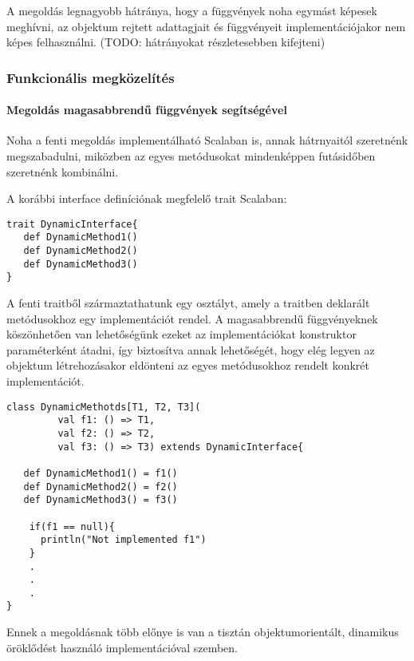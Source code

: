 A megoldás legnagyobb hátránya, hogy a függvények noha egymást képesek meghívni, az objektum rejtett adattagjait
és függvényeit implementációjakor nem képes felhasználni. (TODO: hátrányokat részletesebben kifejteni)


\subsubsection{Funkcionális megközelítés}

\paragraph{Megoldás magasabbrendű függvények segítségével}
Noha a fenti megoldás implementálható Scalaban is, annak hátrnyaitól szeretnénk megszabadulni, miközben
az egyes metódusokat mindenképpen futásidőben szeretnénk kombinálni.

A korábbi interface definíciónak megfelelő trait Scalaban:
  
\begin{lstlisting}
trait DynamicInterface{
   def DynamicMethod1()
   def DynamicMethod2()
   def DynamicMethod3()
}
\end{lstlisting}

A fenti traitből származtathatunk egy osztályt, amely a traitben deklarált metódusokhoz egy implementációt rendel. A magasabbrendű
függvényeknek köszönhetően van lehetőségünk ezeket az implementációkat konstruktor paraméterként átadni, így biztosítva annak
lehetőségét, hogy elég legyen az objektum létrehozásakor eldönteni az egyes metódusokhoz rendelt konkrét implementációt.

\begin{lstlisting}
class DynamicMethotds[T1, T2, T3](
         val f1: () => T1,
         val f2: () => T2,
         val f3: () => T3) extends DynamicInterface{	
		 
   def DynamicMethod1() = f1()
   def DynamicMethod2() = f2()
   def DynamicMethod3() = f3()
   
    if(f1 == null){
	  println("Not implemented f1")
	}
	.
	.
	.
}
\end{lstlisting}

Ennek a megoldásnak több előnye is van a tisztán objektumorientált, dinamikus öröklődést használó implementációval szemben.

